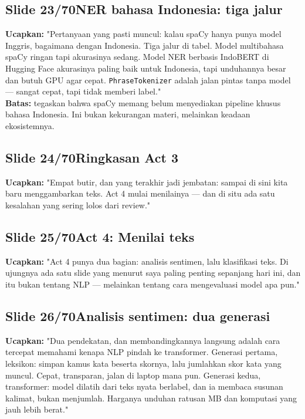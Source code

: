 \documentclass[11pt]{article}
\renewcommand{\framebox}[1]{\colorbox{acc!15}{\textcolor{acc}{\textbf{#1}}}}
\begin{document}
\subsection*{\framebox{Slide 23/70}\quad NER bahasa Indonesia: tiga jalur}
\textbf{Ucapkan:} "Pertanyaan yang pasti muncul: kalau spaCy hanya punya model Inggris, bagaimana dengan Indonesia. Tiga jalur di tabel. Model multibahasa spaCy ringan tapi akurasinya sedang. Model NER berbasis IndoBERT di Hugging Face akurasinya paling baik untuk Indonesia, tapi unduhannya besar dan butuh GPU agar cepat. \texttt{PhraseTokenizer} adalah jalan pintas tanpa model — sangat cepat, tapi tidak memberi label."\\[2pt]
\textbf{Batas:} tegaskan bahwa spaCy memang belum menyediakan pipeline khusus bahasa Indonesia. Ini bukan kekurangan materi, melainkan keadaan ekosistemnya.\\[2pt]

\subsection*{\framebox{Slide 24/70}\quad Ringkasan Act 3}
\textbf{Ucapkan:} "Empat butir, dan yang terakhir jadi jembatan: sampai di sini kita baru menggambarkan teks. Act 4 mulai menilainya — dan di situ ada satu kesalahan yang sering lolos dari review."\\[2pt]

\subsection*{\framebox{Slide 25/70}\quad Act 4: Menilai teks}
\textbf{Ucapkan:} "Act 4 punya dua bagian: analisis sentimen, lalu klasifikasi teks. Di ujungnya ada satu slide yang menurut saya paling penting sepanjang hari ini, dan itu bukan tentang NLP — melainkan tentang cara mengevaluasi model apa pun."\\[2pt]

\subsection*{\framebox{Slide 26/70}\quad Analisis sentimen: dua generasi}
\textbf{Ucapkan:} "Dua pendekatan, dan membandingkannya langsung adalah cara tercepat memahami kenapa NLP pindah ke transformer. Generasi pertama, leksikon: simpan kamus kata beserta skornya, lalu jumlahkan skor kata yang muncul. Cepat, transparan, jalan di laptop mana pun. Generasi kedua, transformer: model dilatih dari teks nyata berlabel, dan ia membaca susunan kalimat, bukan menjumlah. Harganya unduhan ratusan MB dan komputasi yang jauh lebih berat."\\[2pt]
\end{document}
